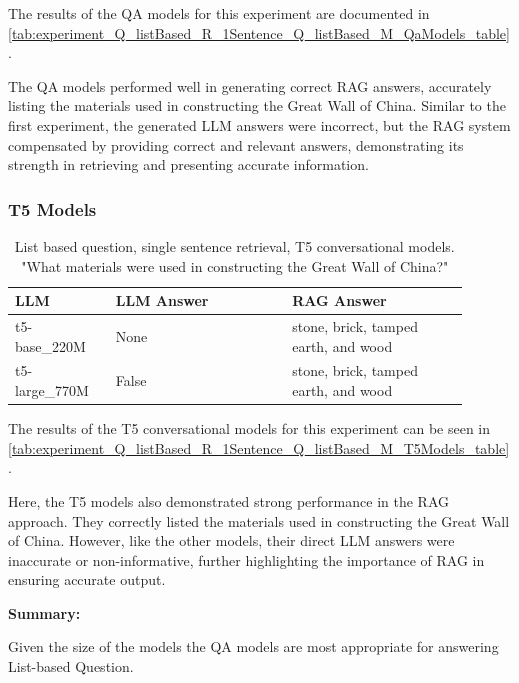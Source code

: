 \documentclass{wseas}
\begin{document}
The results of the QA models for this experiment are documented in \autoref{tab:experiment_Q_listBased_R_1Sentence_Q_listBased_M_QaModels_table}.

The QA models performed well in generating correct RAG answers, accurately listing the materials used in constructing the Great Wall of China. 
Similar to the first experiment, the generated LLM answers were incorrect, but the RAG system compensated by providing correct and relevant answers,
demonstrating its strength in retrieving and presenting accurate information.


\subsubsection{T5 Models}

\begin{table}[htbp]
  \centering
  \caption{List based question, single sentence retrieval, T5 conversational models. "What materials were used in constructing the Great Wall of China?"} %
  \label{tab:experiment_Q_listBased_R_1Sentence_Q_listBased_M_T5Models_table} 
  \begin{tabular}{|p{0.20\linewidth}|p{0.35\linewidth}|p{0.35\linewidth}|}
    \hline
    \textbf{LLM} & \textbf{LLM Answer} & \textbf{RAG Answer} \\ \hline
    t5-base\_220M & None & stone, brick, tamped earth, and wood \\ \hline
    t5-large\_770M & False & stone, brick, tamped earth, and wood \\ \hline
  \end{tabular}
\end{table}

The results of the T5 conversational models for this experiment can be seen 
in \autoref{tab:experiment_Q_listBased_R_1Sentence_Q_listBased_M_T5Models_table}.

Here, the T5 models also demonstrated strong performance in the RAG approach.
They correctly listed the materials used in constructing the Great Wall of China.
However, like the other models, their direct LLM answers were inaccurate or non-informative,
further highlighting the importance of RAG in ensuring accurate output.

\textbf{Summary:}

Given the size of the models the QA models are most appropriate for
answering List-based Question.
\end{document}
